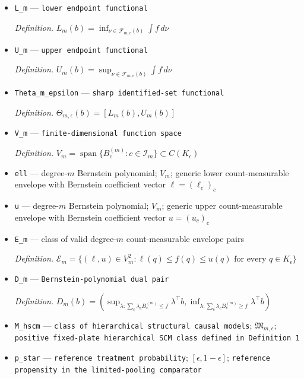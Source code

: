 \documentclass{article}
\begin{document}
\begin{itemize}
  \par\smallskip\noindent\emph{Definition.} \(\tau(\mu)=\int f(q)\,d\mu(q)\)
  \item \texttt{L\_\allowbreak{}m} --- \texttt{lower endpoint functional}
  \par\smallskip\noindent\emph{Definition.} \(L_m(b)=\inf_{\nu\in\mathcal F_{m,\epsilon}(b)}\int f\,d\nu\)
  \item \texttt{U\_\allowbreak{}m} --- \texttt{upper endpoint functional}
  \par\smallskip\noindent\emph{Definition.} \(U_m(b)=\sup_{\nu\in\mathcal F_{m,\epsilon}(b)}\int f\,d\nu\)
  \item \texttt{Theta\_\allowbreak{}m\_\allowbreak{}epsilon} --- \texttt{sharp identified-\allowbreak{}set functional}
  \par\smallskip\noindent\emph{Definition.} \(\Theta_{m,\epsilon}(b)=[L_m(b),U_m(b)]\)
  \item \texttt{V\_\allowbreak{}m} --- \texttt{finite-\allowbreak{}dimensional function space}
  \par\smallskip\noindent\emph{Definition.} \(V_m=\operatorname{span}\{B_c^{(m)}:c\in\mathcal I_m\}\subset C(K_{\epsilon})\)
  \item \texttt{ell} --- degree-\(m\) Bernstein polynomial; \(V_m\); generic lower count-measurable envelope with Bernstein coefficient vector \(\ell=(\ell_c)_c\)
  \item \texttt{u} --- degree-\(m\) Bernstein polynomial; \(V_m\); generic upper count-measurable envelope with Bernstein coefficient vector \(u=(u_c)_c\)
  \item \texttt{E\_\allowbreak{}m} --- class of valid degree-\(m\) count-measurable envelope pairs
  \par\smallskip\noindent\emph{Definition.} \(\mathcal E_m=\{(\ell,u)\in V_m^2:\ell(q)\le f(q)\le u(q)\text{ for every }q\in K_{\epsilon}\}\)
  \item \texttt{D\_\allowbreak{}m} --- \texttt{Bernstein-\allowbreak{}polynomial dual pair}
  \par\smallskip\noindent\emph{Definition.} \(D_m(b)=(\sup_{\lambda:\sum_c\lambda_cB_c^{(m)}\le f}\lambda^\top b,\inf_{\lambda:\sum_c\lambda_cB_c^{(m)}\ge f}\lambda^\top b)\)
  \item \texttt{M\_\allowbreak{}hscm} --- \texttt{class of hierarchical structural causal models}; \(\mathfrak M_{m,\epsilon}\); \texttt{positive fixed-\allowbreak{}plate hierarchical SCM class defined in Definition 1}
  \item \texttt{p\_\allowbreak{}star} --- \texttt{reference treatment probability}; \([\epsilon,1-\epsilon]\); \texttt{reference propensity in the limited-\allowbreak{}pooling comparator}

\end{itemize}
\end{document}
